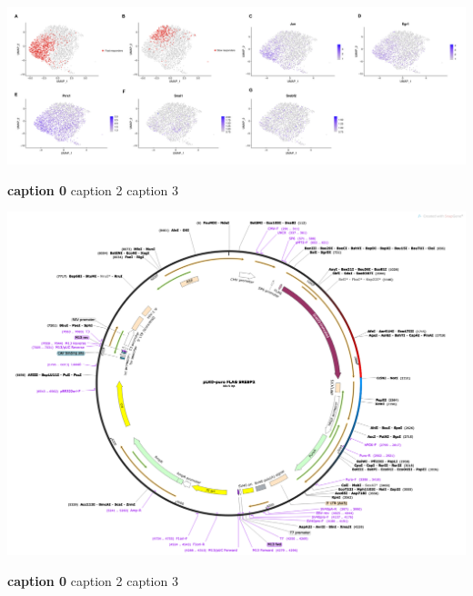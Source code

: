\begin{suppfigure}[p]  
    \centering
    \includegraphics[width=\linewidth]{figures/hedgehog/SuppFigure10.png}
    \caption[caption1]{
        \textbf{caption 0}
        caption 2
        caption 3   
    }
    \label{fig:hh_figureS10}
\end{suppfigure}


\begin{suppfigure}[p]  
    \centering
    \includegraphics[width=\linewidth]{figures/hedgehog/SuppFigure11.png}
    \caption[caption1]{
        \textbf{caption 0}
        caption 2
        caption 3   
    }
    \label{fig:hh_figureS11}
\end{suppfigure}



